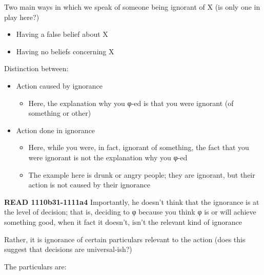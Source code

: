 \documentclass[11pt]{article}
\newcommand{\gk}[1]{\textgreek{#1}}
\begin{document}
\noindent Two main ways in which we speak of someone being ignorant of X (is only one in play here?)

\begin{itemize}\item{Having a false belief about X}\item{Having no beliefs concerning X}\end{itemize}

\noindent Distinction between:

\begin{itemize}\item{Action caused by ignorance}\begin{itemize}\item{Here, the explanation why you \gk{φ}-ed is that you were ignorant (of something or other)}\end{itemize}\item{Action done in ignorance}\begin{itemize}\item{Here, while you were, in fact, ignorant of something, the fact that you were ignorant is not the explanation why you \gk{φ}-ed}\item{The example here is drunk or angry people; they are ignorant, but their action is not caused by their ignorance}\end{itemize}\end{itemize}

\noindent\textbf{READ 1110b31-1111a4} Importantly, he doesn't think that the ignorance is at the level of decision; that is, deciding to \gk{φ} because you think \gk{φ} is or will achieve something good, when it fact it doesn't, isn't the relevant kind of ignorance
\vspace*{2mm}

\noindent Rather, it is ignorance of certain particulars relevant to the action (does this suggest that decisions are universal-ish?)
\vspace*{2mm}

\noindent The particulars are:
\end{document}
